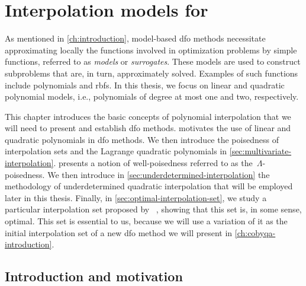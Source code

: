 %
%
%
\chapter{Interpolation models for }
\label{ch:interpolation}

As mentioned in \cref{ch:introduction}, model-based \gls{dfo} methods necessitate approximating locally the functions involved in optimization problems by simple functions, referred to as \emph{models} or \emph{surrogates}.
These models are used to construct subproblems that are, in turn, approximately solved.
Examples of such functions include polynomials and \glspl{rbf}.
In this thesis, we focus on linear and quadratic polynomial models, i.e., polynomials of degree at most one and two, respectively.

This chapter introduces the basic concepts of polynomial interpolation that we will need to present and establish \gls{dfo} methods.
 motivates the use of linear and quadratic polynomials in \gls{dfo} methods.
We then introduce the poisedness of interpolation sets and the Lagrange quadratic polynomials in \cref{sec:multivariate-interpolation}.
 presents a notion of well-poisedness referred to as the~$\Lambda$-poisedness.
We then introduce in \cref{sec:underdetermined-interpolation} the methodology of underdetermined quadratic interpolation that will be employed later in this thesis.
Finally, in \cref{sec:optimal-interpolation-set}, we study a particular interpolation set proposed by \citeauthor{Powell_2006}~\cite{Powell_2006}, showing that this set is, in some sense, optimal.
This set is essential to us, because we will use a variation of it as the initial interpolation set of a new \gls{dfo} method we will present in \cref{ch:cobyqa-introduction}.

\section{Introduction and motivation}
\label{sec:interpolation-introduction}

